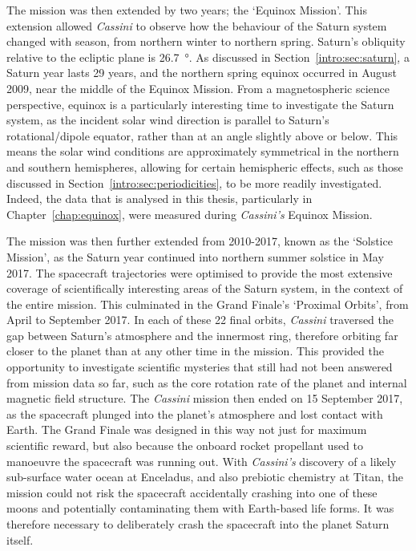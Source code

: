 The mission was then extended by two years; the `Equinox Mission'. This extension allowed \textit{Cassini} to observe how the behaviour of the Saturn system changed with season, from northern winter to northern spring. Saturn's obliquity relative to the ecliptic plane is \SI{26.7}{\degree}. As discussed in Section~\ref{intro:sec:saturn}, a Saturn year lasts 29 years, and the northern spring equinox occurred in August 2009, near the middle of the Equinox Mission. From a magnetospheric science perspective, equinox is a particularly interesting time to investigate the Saturn system, as the incident solar wind direction is parallel to Saturn's rotational/dipole equator, rather than at an angle slightly above or below. This means the solar wind conditions are approximately symmetrical in the northern and southern hemispheres, allowing for certain hemispheric effects, such as those discussed in Section~\ref{intro:sec:periodicities}, to be more readily investigated. Indeed, the data that is analysed in this thesis, particularly in Chapter~\ref{chap:equinox}, were measured during \textit{Cassini's} Equinox Mission.

The mission was then further extended from 2010-2017, known as the `Solstice Mission', as the Saturn year continued into northern summer solstice in May 2017. The spacecraft trajectories were optimised to provide the most extensive coverage of scientifically interesting areas of the Saturn system, in the context of the entire mission. This culminated in the Grand Finale's `Proximal Orbits', from April to September 2017. In each of these 22 final orbits, \textit{Cassini} traversed the gap between Saturn's atmosphere and the innermost ring, therefore orbiting far closer to the planet than at any other time in the mission. This provided the opportunity to investigate scientific mysteries that still had not been answered from mission data so far, such as the core rotation rate of the planet and internal magnetic field structure. The \textit{Cassini} mission then ended on 15 September 2017, as the spacecraft plunged into the planet's atmosphere and lost contact with Earth. The Grand Finale was designed in this way not just for maximum scientific reward, but also because the onboard rocket propellant used to manoeuvre the spacecraft was running out. With \textit{Cassini's} discovery of a likely sub-surface water ocean at Enceladus, and also prebiotic chemistry at Titan, the mission could not risk the spacecraft accidentally crashing into one of these moons and potentially contaminating them with Earth-based life forms. It was therefore necessary to deliberately crash the spacecraft into the planet Saturn itself.

